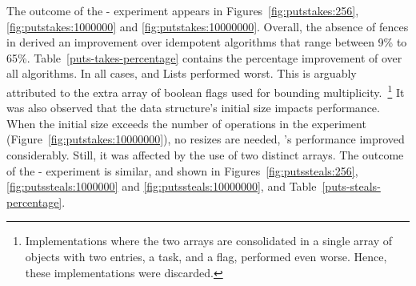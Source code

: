 The outcome of the \Puts{}-\Takes{} experiment appears in Figures~\ref{fig:putstakes:256}, \ref{fig:putstakes:1000000} and \ref{fig:putstakes:10000000}.  Overall, the absence of fences in \NCWSM derived an improvement over idempotent algorithms that range between 9\% to 65\%. Table~\ref{puts-takes-percentage} contains the percentage improvement of \NCWSM over all algorithms. In all cases, \BNCWSM and \BNCWSM Lists performed worst. This is arguably attributed to the extra array of boolean flags used for bounding multiplicity.~\footnote{Implementations where the two arrays are consolidated in a single array of objects with two entries, a task, and a flag, performed even worse. Hence, these implementations were discarded.}  It was also observed that the data structure's initial size impacts performance. When the initial size exceeds the number of operations in the experiment (Figure~\ref{fig:putstakes:10000000}), no resizes are needed, \BNCWSM's performance improved considerably. Still, it was affected by the use of two distinct arrays. The outcome of the \Puts{}-\Steal{}{} experiment is similar, and shown in Figures~\ref{fig:putssteals:256}, \ref{fig:putssteals:1000000} and \ref{fig:putssteals:10000000}, and Table~\ref{puts-steals-percentage}. %





